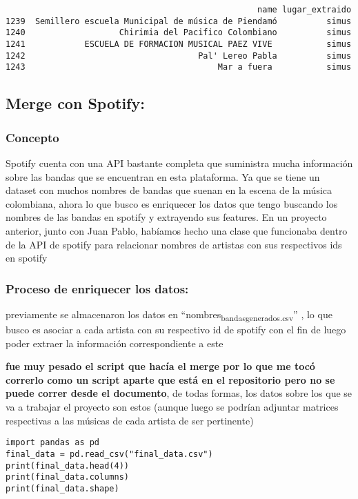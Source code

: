 \documentclass[11pt]{article}
\begin{document}
\begin{verbatim}
                                                   name lugar_extraido
1239  Semillero escuela Municipal de música de Piendamó          simus
1240                   Chirimia del Pacifico Colombiano          simus
1241            ESCUELA DE FORMACION MUSICAL PAEZ VIVE           simus
1242                                   Pal' Lereo Pabla          simus
1243                                       Mar a fuera           simus
\end{verbatim}

\subsection{Merge con Spotify:}
\label{sec:org74ca8fa}
\subsubsection{Concepto}
\label{sec:orgdd832cc}
Spotify cuenta con una API bastante completa que suministra mucha información
sobre las bandas que se encuentran en esta plataforma. Ya que se tiene un
dataset con muchos nombres de bandas que suenan en la escena de
la música colombiana, ahora lo que busco es enriquecer los datos que tengo
buscando los nombres de las bandas en spotify y extrayendo sus features. En un
proyecto anterior, junto con Juan Pablo, habíamos hecho una clase que funcionaba
dentro de la API de spotify para relacionar nombres de artistas con sus
respectivos ids en spotify

\subsubsection{Proceso de enriquecer los datos:}
\label{sec:org441e814}
previamente se almacenaron los datos en ``nombres\textsubscript{bandas}\textsubscript{generados.csv}'' , lo que
busco es asociar a cada artista con su respectivo id de spotify con el fin de
luego poder extraer la información correspondiente a este

\textbf{fue muy pesado el script que hacía el merge por lo que me tocó correrlo como un script aparte que está en el repositorio pero no se puede correr desde el documento}, de todas formas, los datos sobre los que se va a trabajar el proyecto son estos (aunque luego se podrían adjuntar matrices respectivas a las músicas de cada artista de ser pertinente)
\begin{verbatim}
import pandas as pd
final_data = pd.read_csv("final_data.csv")
print(final_data.head(4))
print(final_data.columns)
print(final_data.shape)
\end{verbatim}
\end{document}
